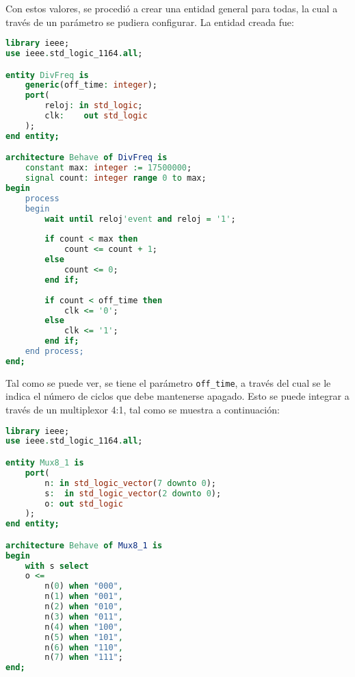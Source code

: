 \documentclass[../procedimientos.tex]{subfiles}
\begin{document}
Con estos valores, se procedió a crear una entidad general para todas, la cual 
a través de un parámetro se pudiera configurar. La entidad creada fue:
\begin{lstlisting}[language=vhdl]
library ieee;
use ieee.std_logic_1164.all;

entity DivFreq is
	generic(off_time: integer);
	port(
		reloj: in std_logic;
		clk:	out std_logic
	);
end entity;

architecture Behave of DivFreq is
	constant max: integer := 17500000;
	signal count: integer range 0 to max;
begin
	process
	begin
		wait until reloj'event and reloj = '1';
		
		if count < max then
			count <= count + 1;
		else
			count <= 0;
		end if;
		
		if count < off_time then
			clk <= '0';
		else
			clk <= '1';
		end if;
	end process;
end;
\end{lstlisting}

Tal como se puede ver, se tiene el parámetro \texttt{off\_time}, a través del 
cual se le indica el número de ciclos que debe mantenerse apagado. Esto se 
puede integrar a través de un multiplexor 4:1, tal como se muestra a 
continuación:
\begin{lstlisting}[language=vhdl]
library ieee;
use ieee.std_logic_1164.all;

entity Mux8_1 is
	port(
		n: in std_logic_vector(7 downto 0);
		s:	in std_logic_vector(2 downto 0);
		o: out std_logic
	);
end entity;

architecture Behave of Mux8_1 is
begin
	with s select
	o <=
		n(0) when "000",
		n(1) when "001",
		n(2) when "010",
		n(3) when "011",
		n(4) when "100",
		n(5) when "101",
		n(6) when "110",
		n(7) when "111";
end;
\end{lstlisting}
\end{document}

